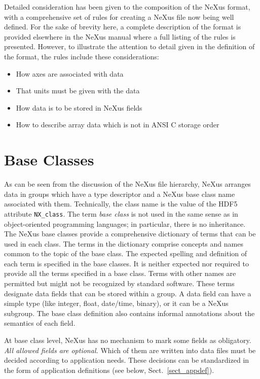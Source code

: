 \documentclass[%
 aip,
rsi,
 amsmath,amssymb,
 reprint,%
]{revtex4-1}
\begin{document}
Detailed consideration has been given to the composition of the NeXus format, 
with a comprehensive set of rules for creating a NeXus file now being well defined. 
For the sake of brevity here, a complete description of the format is 
provided elsewhere in the NeXus manual\cite{nxman} where a full listing of the 
rules is presented. However, to illustrate the attention to detail given in the 
definition of the format, the rules include these considerations:
\begin{itemize}
\item How axes are associated with data
\item That units must be given with the data
\item How data is to be stored in NeXus fields
\item How to describe array data which is not in ANSI C storage order
\end{itemize}


\section{Base Classes}
 \label{sect_baseclasses}

As can be seen from the discussion of the NeXus file hierarchy, 
NeXus arranges data in groups which have a 
type descriptor and a NeXus base class name associated with them.
Technically, the class name is the value of the HDF5 attribute \texttt{NX\_class}.
The term \emph{base class} is not used in the same sense as in  
object-oriented programming languages; in particular, there is no inheritance.
The NeXus base classes provide a comprehensive dictionary of terms 
that can be used in each class. 
The terms in the dictionary comprise concepts and names common to the topic of the base class.
The expected spelling and definition of each term is specified in the base classes. 
It is neither expected nor required to provide all the terms specified in a base class. 
Terms with other names are permitted but might not be recognized by standard software.
These terms designate data fields that can be stored within a group.
A data field can have a simple type (like integer, float, date/time, binary),
or it can be a NeXus subgroup.
The base class definition also contains informal annotations
about the semantics of each field.

At base class level, NeXus has no mechanism to mark some fields as obligatory.
\emph{All allowed fields are optional.}
Which of them are written into data files must be decided
according to application needs.
These decisions can be standardized in the form of
application definitions (see below, Sect.~\ref{sect_appdef}).
\end{document}
